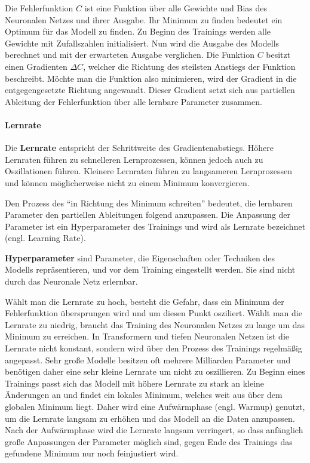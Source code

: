 Die Fehlerfunktion $C$ ist eine Funktion über alle Gewichte und Bias des Neuronalen Netzes und ihrer Ausgabe.
Ihr Minimum zu finden bedeutet ein Optimum für das Modell zu finden.
Zu Beginn des Trainings werden alle Gewichte mit Zufallszahlen initialisiert.
Nun wird die Ausgabe des Modells berechnet und mit der erwarteten Ausgabe verglichen.
Die Funktion $C$ besitzt einen Gradienten $\Delta C$, welcher die Richtung des steilsten Anstiegs der Funktion beschreibt.
Möchte man die Funktion also minimieren, wird der Gradient in die entgegengesetzte Richtung angewandt.
Dieser Gradient setzt sich aus partiellen Ableitung der Fehlerfunktion über alle lernbare Parameter zusammen.\\

\paragraph{Lernrate}
\begin{definition}\label{def:lernrate}
    Die \textbf{Lernrate} entspricht der Schrittweite des Gradientenabstiegs. Höhere Lernraten führen zu schnelleren Lernprozessen, können jedoch auch zu Oszillationen führen.
    Kleinere Lernraten führen zu langsameren Lernprozessen und können möglicherweise nicht zu einem Minimum konvergieren.
\end{definition}
Den Prozess des \enquote{in Richtung des Minimum schreiten} bedeutet, die lernbaren Parameter den partiellen Ableitungen folgend anzupassen.
Die Anpassung der Parameter ist ein Hyperparameter des Trainings und wird als Lernrate bezeichnet (engl. Learning Rate).\\

\begin{definition}\label{def:hyperparameter}
    \textbf{Hyperparameter} sind Parameter, die Eigenschaften oder Techniken des Modells repräsentieren, und vor dem Training eingestellt werden.
    Sie sind nicht durch das Neuronale Netz erlernbar.
\end{definition}

Wählt man die Lernrate zu hoch, besteht die Gefahr, dass ein Minimum der Fehlerfunktion übersprungen wird und um diesen Punkt osziliert.
Wählt man die Lernrate zu niedrig, braucht das Training des Neuronalen Netzes zu lange um das Minimum zu erreichen.
In Transformern und tiefen Neuronalen Netzen ist die Lernrate nicht konstant, sondern wird über den Prozess des Trainings regelmäßig angepasst.
Sehr große Modelle besitzen oft mehrere Milliarden Parameter und benötigen daher eine sehr kleine Lernrate um nicht zu oszillieren.
Zu Beginn eines Trainings passt sich das Modell mit höhere Lernrate zu stark an kleine Änderungen an und findet ein lokales Minimum, welches weit aus über dem globalen Minimum liegt.
Daher wird eine Aufwärmphase (engl. Warmup) genutzt, um die Lernrate langsam zu erhöhen und das Modell an die Daten anzupassen.
Nach der Aufwärmphase wird die Lernrate langsam verringert, so dass anfänglich große Anpassungen der Parameter möglich sind, gegen Ende des Trainings das gefundene Minimum nur noch feinjustiert wird.\\

